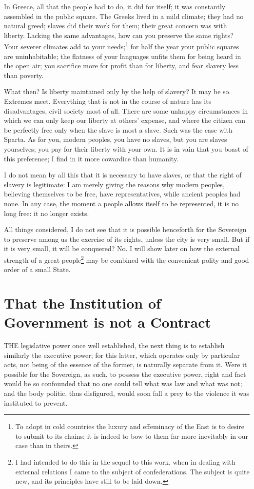 \documentclass[12pt]{report}
\begin{document}
In Greece, all that the people had to do, it did for itself; it was constantly assembled in the public square. The Greeks lived in a mild climate; they had no natural greed; slaves did their work for them; their great concern was with liberty. Lacking the same advantages, how can you preserve the same rights? Your severer climates add to your needs;\footnote{To adopt in cold countries the luxury and effeminacy of the East is to desire to submit to its chains; it is indeed to bow to them far more inevitably in our case than in theirs.} for half the year your public squares are uninhabitable; the flatness of your languages unfits them for being heard in the open air; you sacrifice more for profit than for liberty, and fear slavery less than poverty.

What then? Is liberty maintained only by the help of slavery? It may be so. Extremes meet. Everything that is not in the course of nature has its disadvantages, civil society most of all. There are some unhappy circumstances in which we can only keep our liberty at others' expense, and where the citizen can be perfectly free only when the slave is most a slave. Such was the case with Sparta. As for you, modern peoples, you have no slaves, but you are slaves yourselves; you pay for their liberty with your own. It is in vain that you boast of this preference; I find in it more cowardice than humanity.

I do not mean by all this that it is necessary to have slaves, or that the right of slavery is legitimate: I am merely giving the reasons why modern peoples, believing themselves to be free, have representatives, while ancient peoples had none. In any case, the moment a people allows itself to be represented, it is no long free: it no longer exists.

All things considered, I do not see that it is possible henceforth for the Sovereign to preserve among us the exercise of its rights, unless the city is very small. But if it is very small, it will be conquered? No. I will show later on how the external strength of a great people\footnote{I had intended to do this in the sequel to this work, when in dealing with external relations I came to the subject of confederations. The subject is quite new, and its principles have still to be laid down.} may be combined with the convenient polity and good order of a small State.

\section{That the Institution of Government is not a Contract}
THE legislative power once well established, the next thing is to establish similarly the executive power; for this latter, which operates only by particular acts, not being of the essence of the former, is naturally separate from it. Were it possible for the Sovereign, as such, to possess the executive power, right and fact would be so confounded that no one could tell what was law and what was not; and the body politic, thus disfigured, would soon fall a prey to the violence it was instituted to prevent.
\end{document}
